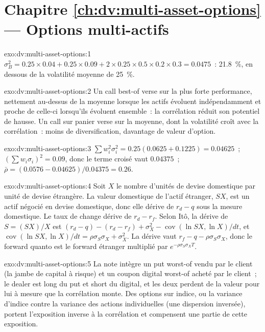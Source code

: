 \section*{Chapitre \ref{ch:dv:multi-asset-options} --- Options multi-actifs}

\begin{solution}{exo:dv:multi-asset-options:1}
$\sigma_B^2=0.25\times0.04+0.25\times0.09+2\times0.25\times0.5\times0.2\times0.3=0.0475$~: 21.8~\%, en dessous de la volatilité moyenne de
25~\%.
\end{solution}

\begin{solution}{exo:dv:multi-asset-options:2}
Un call best-of verse sur la plus forte performance, nettement au-dessus de la moyenne lorsque les actifs évoluent indépendamment et proche
de celle-ci lorsqu'ils évoluent ensemble~: la corrélation réduit son potentiel de hausse. Un call sur panier verse sur la moyenne, dont la volatilité croît avec
la corrélation~: moins de diversification, davantage de valeur d'option.
\end{solution}

\begin{solution}{exo:dv:multi-asset-options:3}
$\sum w_i^2\sigma_i^2=0.25(0.0625+0.1225)=0.04625$~; $(\sum w_i\sigma_i)^2=0.09$, donc le terme croisé vaut $0.04375$~;
$\bar\rho=(0.0576-0.04625)/0.04375=0.26$.
\end{solution}

\begin{solution}{exo:dv:multi-asset-options:4}
Soit $X$ le nombre d'unités de devise domestique par unité de devise étrangère. La valeur domestique de l'actif étranger, $SX$, est un actif négocié
en devise domestique, donc elle dérive de $r_d-q$ sous la mesure domestique. Le taux de change dérive de $r_d-r_f$. Selon Itô, la dérive de $S=(SX)/X$ est
$(r_d-q)-(r_d-r_f)+\sigma_X^2-\operatorname{cov}(\ln SX,\ln X)/dt$, et
$\operatorname{cov}(\ln SX,\ln X)/dt=\rho\sigma_S\sigma_X+\sigma_X^2$. La dérive vaut $r_f-q-\rho\sigma_S\sigma_X$, donc le forward quanto
est le forward étranger multiplié par $e^{-\rho\sigma_S\sigma_XT}$.
\end{solution}

\begin{solution}{exo:dv:multi-asset-options:5}
La note intègre un put worst-of vendu par le client (la jambe de capital à risque) et un coupon digital worst-of acheté par le client~;
le dealer est long du put et short du digital, et les deux perdent de la valeur pour lui à mesure que la corrélation monte. Des options sur indice, ou
la variance d'indice contre la variance des actions individuelles (une dispersion inversée), portent l'exposition inverse à la corrélation et compensent une partie
de cette exposition.
\end{solution}

